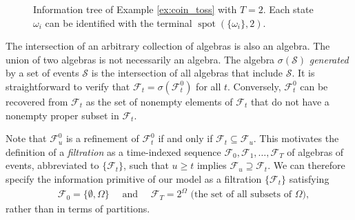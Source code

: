 \documentclass[\topdir/lecture\_notes.tex]{subfiles}
\begin{document}
\begin{figure}[htbp] %
    \centering %
    \caption{Information tree of Example \ref{ex:coin_toss} with $T=2$. Each state $\omega_{i}$ can be identified with the terminal $\operatorname{spot}(\{\omega_{i}\}, 2)$.}
    \label{fig:coin_toss}
\end{figure}

The intersection of an arbitrary collection of algebras is also an algebra. The union of two algebras is not necessarily an algebra. The algebra $\sigma(\mathcal{S})$ \emph{generated} by a set of events $\mathcal{S}$ is the intersection of all algebras that include $\mathcal{S}$. It is straightforward to verify that $\mathcal{F}_{t}=\sigma(\mathcal{F}_{t}^{0})$ for all $t$. Conversely, $\mathcal{F}_{t}^{0}$ can be recovered from $\mathcal{F}_{t}$ as the set of nonempty elements of $\mathcal{F}_{t}$ that do not have a nonempty proper subset in $\mathcal{F}_{t}$.

Note that $\mathcal{F}_{u}^{0}$ is a refinement of $\mathcal{F}_{t}^{0}$ if and only if $\mathcal{F}_{t} \subseteq \mathcal{F}_{u}$. This motivates the definition of a \emph{filtration} as a time-indexed sequence $\mathcal{F}_{0}, \mathcal{F}_{1}, \ldots, \mathcal{F}_{T}$ of algebras of events, abbreviated to $\{\mathcal{F}_{t}\}$, such that $u \geq t$ implies $\mathcal{F}_{u} \supseteq \mathcal{F}_{t}$. We can therefore specify the information primitive of our model as a filtration $\{\mathcal{F}_{t}\}$ satisfying
\begin{align}
\quad \mathcal{F}_{0}=\{\emptyset, \Omega\} \quad \text{ and } \quad \mathcal{F}_{T}=2^{\Omega} \text{ (the set of all subsets of $\Omega$)}, \label{eq:filtration_boundary_conditions}
\end{align}
rather than in terms of partitions. 
\end{document}
